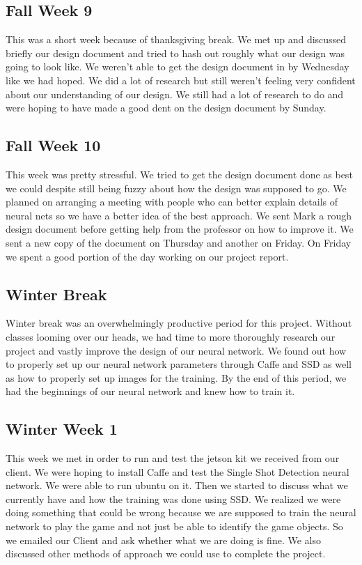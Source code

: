 \documentclass[onecolumn, draftclsnofoot,10pt, compsoc]{IEEEtran}
\begin{document}
\subsection{Fall Week 9}
This was a short week because of thanksgiving break.
We met up and discussed briefly our design document and tried to hash out roughly what our design was going to look like.
We weren't able to get the design document in by Wednesday like we had hoped.
We did a lot of research but still weren't feeling very confident about our understanding of our design.
We still had a lot of research to do and were hoping to have made a good dent on the design document by Sunday.

\subsection{Fall Week 10}
This week was pretty stressful.
We tried to get the design document done as best we could despite still being fuzzy about how the design was supposed to go.
We planned on arranging a meeting with people who can better explain details of neural nets so we have a better idea of the best approach.
We sent Mark a rough design document before getting help from the professor on how to improve it.
We sent a new copy of the document on Thursday and another on Friday.
On Friday we spent a good portion of the day working on our project report.

\subsection{Winter Break}
Winter break was an overwhelmingly productive period for this project.
Without classes looming over our heads, we had time to more thoroughly research our project and vastly improve the design of our neural network.
We found out how to properly set up our neural network parameters through Caffe and SSD as well as how to properly set up images for the training.
By the end of this period, we had the beginnings of our neural network and knew how to train it.

\subsection{Winter Week 1}
This week we met in order to run and test the jetson kit we received from our client.
We were hoping to install Caffe and test the Single Shot Detection neural network. 
We were able to run ubuntu on it. 
Then we started to discuss what we currently have and how the training was done using SSD. 
We realized we were doing something that could be wrong because we are supposed to train the neural network to play the game and not just be able to identify the game objects. 
So we emailed our Client and ask whether what we are doing is fine. 
We also discussed other methods of approach we could use to complete the project.
\end{document}
